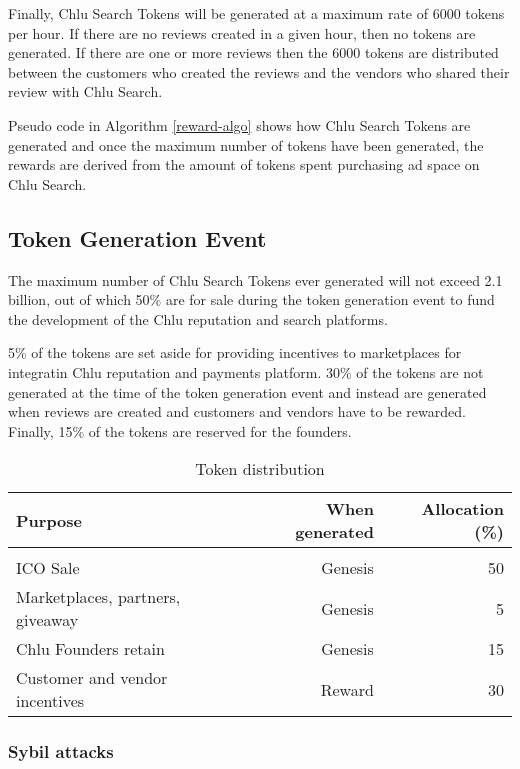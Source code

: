 \documentclass[a4paper]{article}
\begin{document}
Finally, Chlu Search Tokens will be generated at a maximum rate of
$6000$ tokens per hour. If there are no reviews created in a given
hour, then no tokens are generated. If there are one or more reviews
then the $6000$ tokens are distributed between the customers who
created the reviews and the vendors who shared their review with Chlu
Search.

Pseudo code in Algorithm \ref{reward-algo} shows how Chlu Search Tokens
are generated and once the maximum number of tokens have been
generated, the rewards are derived from the amount of tokens spent
purchasing ad space on Chlu Search.

\subsection{Token Generation Event}

The maximum number of Chlu Search Tokens ever generated will not
exceed 2.1 billion, out of which 50\% are for sale during the token
generation event to fund the development of the Chlu reputation and
search platforms.

5\% of the tokens are set aside for providing incentives to
marketplaces for integratin Chlu reputation and payments
platform. 30\% of the tokens are not generated at the time of the
token generation event and instead are generated when reviews are
created and customers and vendors have to be rewarded. Finally, 15\%
of the tokens are reserved for the founders.

\begin{center}
  \begin{table}
    \begin{tabular}{l r r}
      \textbf{Purpose} & \textbf{When generated} & \textbf{Allocation (\%)} \\
      \hline \\
      ICO Sale & Genesis & 50 \\
      Marketplaces, partners, giveaway  & Genesis & 5 \\
      Chlu Founders retain & Genesis & 15 \\
      Customer and vendor incentives & Reward & 30
    \end{tabular}
    \caption{Token distribution}
  \end{table}
\end{center}

\subsubsection{Sybil attacks}
\end{document}
